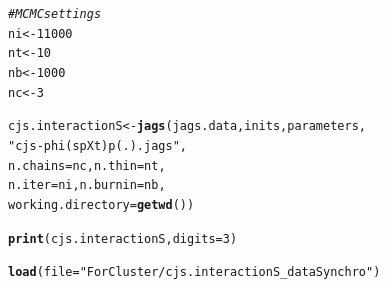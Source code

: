 \documentclass[a4paper, 10pt]{scrartcl}\usepackage[]{graphicx}\usepackage[]{color}
\makeatletter
\newcommand{\hlnum}[1]{\textcolor[rgb]{0.686,0.059,0.569}{#1}}%
\newcommand{\hlstr}[1]{\textcolor[rgb]{0.192,0.494,0.8}{#1}}%
\newcommand{\hlcom}[1]{\textcolor[rgb]{0.678,0.584,0.686}{\textit{#1}}}%
\newcommand{\hlstd}[1]{\textcolor[rgb]{0.345,0.345,0.345}{#1}}%
\newcommand{\hlkwb}[1]{\textcolor[rgb]{0.69,0.353,0.396}{#1}}%
\newcommand{\hlkwc}[1]{\textcolor[rgb]{0.333,0.667,0.333}{#1}}%
\newcommand{\hlkwd}[1]{\textcolor[rgb]{0.737,0.353,0.396}{\textbf{#1}}}%
\newenvironment{kframe}{%
 \def\at@end@of@kframe{}%
 \ifinner\ifhmode%
  \def\at@end@of@kframe{\end{minipage}}%
  \begin{minipage}{\columnwidth}%
 \fi\fi%
 \def\FrameCommand##1{\hskip\@totalleftmargin \hskip-\fboxsep
 \colorbox{shadecolor}{##1}\hskip-\fboxsep
     \hskip-\linewidth \hskip-\@totalleftmargin \hskip\columnwidth}%
 \MakeFramed {\advance\hsize-\width
   \@totalleftmargin\z@ \linewidth\hsize
   \@setminipage}}%
 {\par\unskip\endMakeFramed%
 \at@end@of@kframe}
\newenvironment{knitrout}{}{} %
\makeatother
\begin{document}
\begin{knitrout}
\begin{kframe}
\begin{alltt}
\hlcom{# MCMC settings}
\hlstd{ni} \hlkwb{<-} \hlnum{11000}
\hlstd{nt} \hlkwb{<-} \hlnum{10}
\hlstd{nb} \hlkwb{<-} \hlnum{1000}
\hlstd{nc} \hlkwb{<-} \hlnum{3}

\hlstd{cjs.interactionS} \hlkwb{<-} \hlkwd{jags}\hlstd{(jags.data, inits, parameters,}
                         \hlstr{"cjs-phi(spXt)p(.).jags"}\hlstd{,}
                        \hlkwc{n.chains} \hlstd{= nc,} \hlkwc{n.thin} \hlstd{= nt,}
                        \hlkwc{n.iter} \hlstd{= ni,} \hlkwc{n.burnin} \hlstd{= nb,}
                        \hlkwc{working.directory} \hlstd{=} \hlkwd{getwd}\hlstd{())}

\hlkwd{print}\hlstd{(cjs.interactionS,} \hlkwc{digits} \hlstd{=} \hlnum{3}\hlstd{)}
\end{alltt}
\end{kframe}
\end{knitrout}

\begin{knitrout}
\color{fgcolor}\begin{kframe}
\begin{alltt}
\hlkwd{load}\hlstd{(}\hlkwc{file} \hlstd{=} \hlstr{"ForCluster/cjs.interactionS_dataSynchro"}\hlstd{)}
\end{alltt}
\end{kframe}
\end{knitrout}
\end{document}
